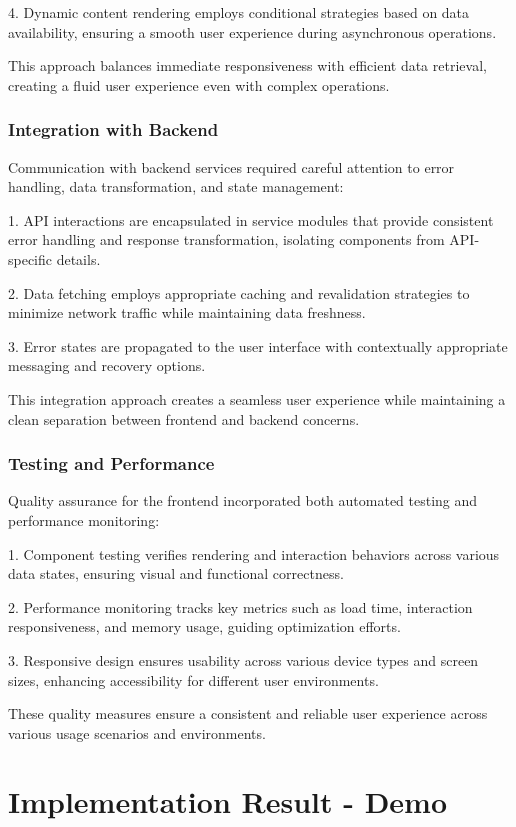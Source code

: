 4. Dynamic content rendering employs conditional strategies based on data availability, ensuring a smooth user experience during asynchronous operations.

This approach balances immediate responsiveness with efficient data retrieval, creating a fluid user experience even with complex operations.

\subsubsection{Integration with Backend}

Communication with backend services required careful attention to error handling, data transformation, and state management:

1. API interactions are encapsulated in service modules that provide consistent error handling and response transformation, isolating components from API-specific details.

2. Data fetching employs appropriate caching and revalidation strategies to minimize network traffic while maintaining data freshness.

3. Error states are propagated to the user interface with contextually appropriate messaging and recovery options.

This integration approach creates a seamless user experience while maintaining a clean separation between frontend and backend concerns.

\subsubsection{Testing and Performance}

Quality assurance for the frontend incorporated both automated testing and performance monitoring:

1. Component testing verifies rendering and interaction behaviors across various data states, ensuring visual and functional correctness.

2. Performance monitoring tracks key metrics such as load time, interaction responsiveness, and memory usage, guiding optimization efforts.

3. Responsive design ensures usability across various device types and screen sizes, enhancing accessibility for different user environments.

These quality measures ensure a consistent and reliable user experience across various usage scenarios and environments.

\section{Implementation Result - Demo}

